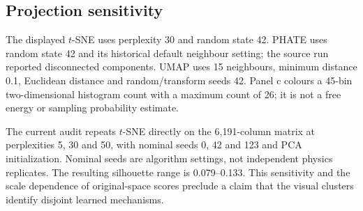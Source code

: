 \documentclass[pdflatex,sn-mathphys-num]{sn-jnl}
\begin{document}
\begin{table}[htbp]
\centering\small
\caption{\textbf{Original-space metrics for the current 927-frame dataset.} Silhouette labels are the 15 model identities, using the same sampled rows as the main figure. The output-feature vector excludes the inactive placeholder. Standardization is column-wise z-scoring over the combined diagnostic sample and is not a training transformation. Neighbour histograms use common distance bins, avoiding the separate SOAP PCA bases. Scores are descriptive and are affected by unequal trajectory populations.}
\label{tab:current_original_space}
\resizebox{\textwidth}{!}{}
\end{table}

\subsection{Projection sensitivity}
The displayed $t$-SNE uses perplexity 30 and random state 42. PHATE uses random state 42 and its historical default neighbour setting; the source run reported disconnected components. UMAP uses 15 neighbours, minimum distance 0.1, Euclidean distance and random/transform seeds 42. Panel c colours a 45-bin two-dimensional histogram count with a maximum count of 26; it is not a free energy or sampling probability estimate.

The current audit repeats $t$-SNE directly on the 6,191-column matrix at perplexities 5, 30 and 50, with nominal seeds 0, 42 and 123 and PCA initialization. Nominal seeds are algorithm settings, not independent physics replicates. The resulting silhouette range is 0.079--0.133. This sensitivity and the scale dependence of original-space scores preclude a claim that the visual clusters identify disjoint learned mechanisms.

\begin{table}[htbp]
\centering\small
\caption{\textbf{Current $t$-SNE sensitivity checks.} Scores use the 15 model labels. Trustworthiness uses five neighbours and compares each projection with the same unprojected input matrix. These metrics assess a visualization and do not measure model prediction uncertainty or DFT accuracy.}
\label{tab:current_tsne_sensitivity}

\end{table}
\end{document}
